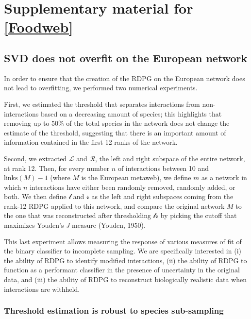 \anglais
\doublespacing
\chapter{Supplementary material for \autoref{Foodweb}}

\section{SVD does not overfit on the European
network}\label{svd-does-not-overfit-on-the-european-network}

In order to ensure that the creation of the RDPG on the European network
does not lead to overfitting, we performed two numerical experiments.

First, we estimated the threshold that separates interactions from
non-interactions based on a decreasing amount of species; this
highlights that removing up to 50\% of the total species in the network
does not change the estimate of the threshold, suggesting that there is
an important amount of information contained in the first 12 ranks of
the network.

Second, we extracted \(\mathcal{L}\) and \(\mathcal{R}\), the left and
right subspace of the entire network, at rank 12. Then, for every number
\(n\) of interactions between 10 and \(\text{links}(M)-1\) (where \(M\)
is the European metaweb), we define \(m\) as a network in which \(n\)
interactions have either been randomly removed, randomly added, or both.
We then define \(\mathcal{l}\) and \(\mathcal{r}\) as the left and right
subspaces coming from the rank-12 RDPG applied to this network, and
compare the original network \(M\) to the one that was reconstructed
after thresholding \(\mathcal{l}\mathcal{r}\) by picking the cutoff that
maximizes Youden's \emph{J} measure (Youden, 1950).

This last experiment allows measuring the response of various measures
of fit of the binary classifier to incomplete sampling. We are
specifically interested in (i) the ability of RDPG to identify modified
interactions, (ii) the ability of RDPG to function as a performant
classifier in the presence of uncertainty in the original data, and
(iii) the ability of RDPG to reconstruct biologically realistic data
when interactions are withheld.

\subsection{Threshold estimation is robust to species
sub-sampling}\label{threshold-estimation-is-robust-to-species-sub-sampling}


